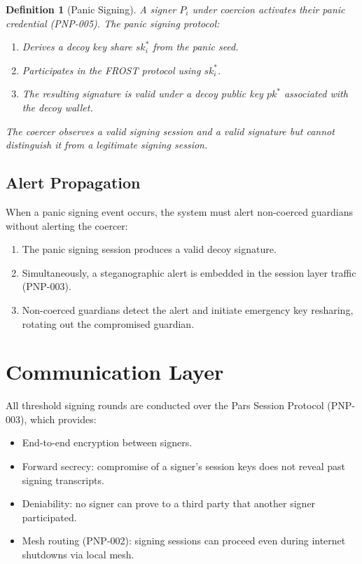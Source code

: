 \documentclass[11pt,a4paper]{article}
\newtheorem{definition}{Definition}[section]
\begin{document}
\begin{definition}[Panic Signing]
    A signer $P_i$ under coercion activates their panic credential
    (PNP-005).  The panic signing protocol:
    \begin{enumerate}[label=(\roman*)]
        \item Derives a decoy key share $sk_i^*$ from the panic seed.
        \item Participates in the FROST protocol using $sk_i^*$.
        \item The resulting signature is valid under a decoy public key
        $pk^*$ associated with the decoy wallet.
    \end{enumerate}
    The coercer observes a valid signing session and a valid signature
    but cannot distinguish it from a legitimate signing session.
\end{definition}

\subsection{Alert Propagation}

When a panic signing event occurs, the system must alert non-coerced
guardians without alerting the coercer:

\begin{enumerate}
    \item The panic signing session produces a valid decoy signature.
    \item Simultaneously, a steganographic alert is embedded in the
    session layer traffic (PNP-003).
    \item Non-coerced guardians detect the alert and initiate emergency
    key resharing, rotating out the compromised guardian.
\end{enumerate}

\section{Communication Layer}
\label{sec:comm}

All threshold signing rounds are conducted over the Pars Session Protocol
(PNP-003), which provides:

\begin{itemize}
    \item End-to-end encryption between signers.
    \item Forward secrecy: compromise of a signer's session keys does
    not reveal past signing transcripts.
    \item Deniability: no signer can prove to a third party that
    another signer participated.
    \item Mesh routing (PNP-002): signing sessions can proceed even
    during internet shutdowns via local mesh.
\end{itemize}
\end{document}
